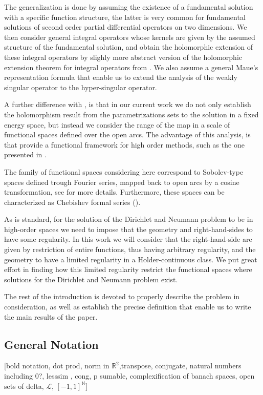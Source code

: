 \documentclass{article}
\newcommand{\todo}[1]{{\color{red}[#1]}}
\newcommand{\IN}{{\mathbb N}}
\newcommand{\IR}{{\mathbb R}}
\begin{document}
The generalization is done by assuming the existence of a fundamental solution with a specific function structure, the latter is very common for  fundamental solutions of second order partial differential operators on two dimensions. We then consider general integral operators whose kernels are given by the assumed structure of the fundamental solution, and obtain the holomorphic extension of these integral operators by  slighly more abstract version of the holomorphic extension theorem for integral operators  from \cite[Theorem 3.12]{Henriquez2021}. We also assume a general Maue's representation formula that enable us to extend the analysis of the weakly singular operator to the hyper-singular operator. 

A further difference with \cite{Henriquez2021}, is that in our current work we do not only establish the holomorphism result from the parametrizations sets to the solution in a fixed energy space, but instead we consider the range of the map in a  scale of functional spaces defined over the open arcs. The advantage of this analysis, is that provide a functional  framework for high order methods, such as the one presented in \cite{JHP20}. 

The family of functional spaces considering here correspond to Sobolev-type spaces defined trough Fourier series, mapped back to open arcs by a cosine transformation, see  \cite[Chapter 11]{saranen2013periodic} for more details. Furthermore, these spaces can be characterized as Chebishev formal series (\cite{Averseng2019}). 

As is standard, for the solution of the Dirichlet and Neumann problem to be in high-order spaces we need to impose that the geometry and right-hand-sides  to have some regularity. In this work we will consider that the right-hand-side are given by restriction of entire functions, thus having arbitrary regularity, and the geometry to have a limited regularity in a Holder-continuous class. We put great effort in finding how this limited regularity restrict the functional spaces where solutions for the Dirichlet and Neumann problem exist. 

The rest of the introduction is devoted to properly describe the problem in consideration, as well as establish the precise definition that enable us to write the main results of the paper. 

\subsection{General Notation}
\todo{bold notation, dot prod, norm in $\IR^2$,transpose, conjugate, natural numbers including 0?, lesssim , cong, p sumable, complexification of banach spaces, open sets of delta, $\mathcal{L}$, $[-1,1]^\IN$}
\end{document}
